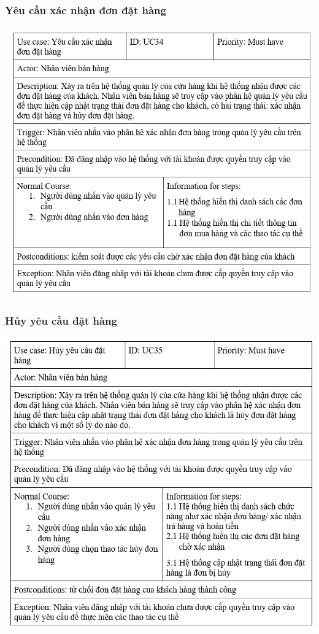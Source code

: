 \documentclass[12pt,a4paper,2sides]{report}
\begin{document}
\subsubsection{Yêu cầu xác nhận đơn đặt hàng}
    \includegraphics[width=1\linewidth]{lib/usecase/yeucauxacnhanddh.png}\\\vspace*{1cm} 
\subsubsection{Hủy yêu cầu đặt hàng}
    \includegraphics[width=1\linewidth]{lib/usecase/huyyeucaudh.png}\\\vspace*{1cm} 
\end{document}
